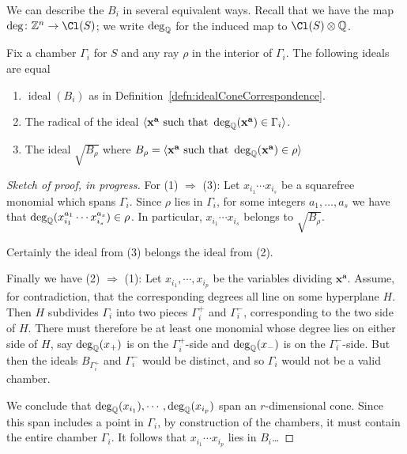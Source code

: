 \documentclass{amsart}
\begin{document}
We can describe the $B_i$ in several equivalent ways.  Recall that we have the map $\deg\colon \ZZ^n\to \Cl(S)$; we write $\deg_{\mathbb Q}$ for the induced map to $\Cl(S)\otimes \QQ$.
\begin{prop}
  Fix a chamber $\Gamma_i$ for $S$ and any ray $\rho$ in the interior of $\Gamma_i$.  The following ideals are equal
  \begin{enumerate}
    \item  $\operatorname{ideal}(B_i)$ as in Definition~\ref{defn:idealConeCorrespondence}.
    \item  The radical of the ideal $\langle \mathbf{x}^{\mathbf{a}} \text{ such that } \deg_{\mathbb Q}(\mathbf{x}^{\mathbf{a}})\in \Gamma_i\rangle$.
    \item  The ideal $\sqrt{B_{\rho}}$ where  $B_{\rho} = \langle \mathbf{x}^{\mathbf{a}} \text{ such that } \deg_{\mathbb Q}(\mathbf{x}^{\mathbf{a}})\in \rho \rangle$
  \end{enumerate}
\end{prop}
\begin{proof}[Sketch of proof, in progress]
  For (1) $\Rightarrow$ (3): Let $x_{i_1}\cdots x_{i_s}$ be a squarefree monomial which spans $\Gamma_i$.  Since $\rho$ lies in $\Gamma_i$, for some integers $a_1, \dots, a_s$ we have that $\deg_{\mathbb Q}(x_{i_1}^{a_1}\cdots x_{i_s}^{a_s}) \in \rho$.  In particular, $x_{i_1}\cdots x_{i_s}$ belongs to $\sqrt{B_{\rho}}$.

  Certainly the ideal from (3) belongs the ideal from (2).

  Finally we have (2) $\Rightarrow$ (1):  Let $x_{i_1}, \cdots, x_{i_p}$ be the variables dividing $\mathbf{x}^{\mathbf{a}}$.  Assume, for contradiction, that the corresponding degrees all line on some hyperplane $H$.  Then $H$ subdivides $\Gamma_i$ into two pieces $\Gamma_i^{+}$ and $\Gamma_i^{-}$, corresponding to the two side of $H$.  There must therefore be at least one monomial whose degree lies on either side of $H$, say $\deg_{\mathbb Q}(x_{+})$ is on the $\Gamma_i^{+}$-side and $\deg_{\mathbb Q}(x_{-})$ is on the $\Gamma_i^{-}$-side.  But then the ideals $B_{\Gamma_i^{+}}$ and $\Gamma_i^{-}$ would be distinct, and so $\Gamma_i$ would not be a valid chamber.

  We conclude that $\deg_{\mathbb Q}(x_{i_1}), \cdots, \deg_{\mathbb Q}(x_{i_p})$ span an $r$-dimensional cone.  Since this span includes a point in $\Gamma_i$, by construction of the chambers, it must contain the entire chamber $\Gamma_i$.  It follows that $x_{i_1}\cdots x_{i_p}$ lies in $B_i$\dots
\end{proof}
\end{document}
